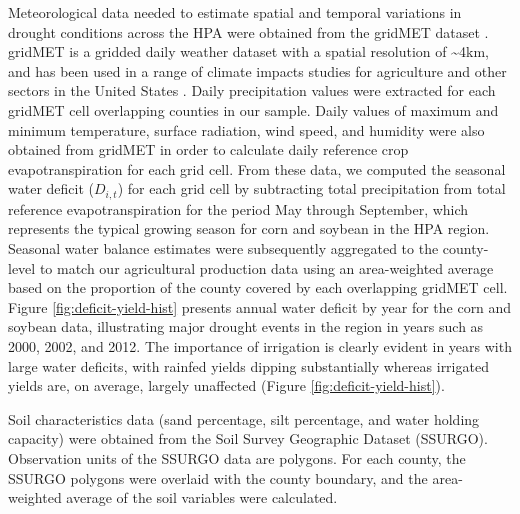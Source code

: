 \documentclass[
]{article}
\begin{document}
Meteorological data needed to estimate spatial and temporal variations in drought conditions across the HPA were obtained from the gridMET dataset \citep{Abatzoglou2013}. gridMET is a gridded daily weather dataset with a spatial resolution of \textasciitilde4km, and has been used in a range of climate impacts studies for agriculture and other sectors in the United States \citep{abatzoglou2016impact, pereira2015crop, crane2018machine, venkatappa2021impacts, zhu2019dissecting}. Daily precipitation values were extracted for each gridMET cell overlapping counties in our sample. Daily values of maximum and minimum temperature, surface radiation, wind speed, and humidity were also obtained from gridMET in order to calculate daily reference crop evapotranspiration for each grid cell. From these data, we computed the seasonal water deficit (\(D_{i,t}\)) for each grid cell by subtracting total precipitation from total reference evapotranspiration for the period May through September, which represents the typical growing season for corn and soybean in the HPA region. Seasonal water balance estimates were subsequently aggregated to the county-level to match our agricultural production data using an area-weighted average based on the proportion of the county covered by each overlapping gridMET cell. Figure \ref{fig:deficit-yield-hist} presents annual water deficit by year for the corn and soybean data, illustrating major drought events in the region in years such as 2000, 2002, and 2012. The importance of irrigation is clearly evident in years with large water deficits, with rainfed yields dipping substantially whereas irrigated yields are, on average, largely unaffected (Figure \ref{fig:deficit-yield-hist}).

Soil characteristics data (sand percentage, silt percentage, and water holding capacity) were obtained from the Soil Survey Geographic
Dataset (SSURGO). Observation units of the SSURGO data are polygons. For each county, the SSURGO polygons were overlaid with the county boundary, and the area-weighted average of the soil variables were calculated.
\end{document}
